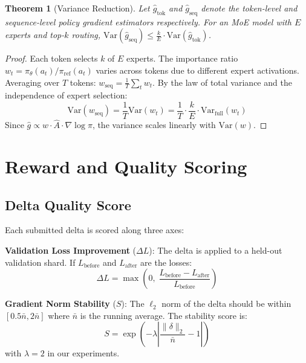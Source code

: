 \documentclass[11pt,letterpaper]{article}
\newtheorem{theorem}{Theorem}[section]
\begin{document}
\begin{theorem}[Variance Reduction]
Let $\hat{g}_{\text{tok}}$ and $\hat{g}_{\text{seq}}$ denote the token-level and sequence-level policy gradient estimators respectively.  For an MoE model with $E$ experts and top-$k$ routing, $\text{Var}(\hat{g}_{\text{seq}}) \leq \frac{k}{E} \cdot \text{Var}(\hat{g}_{\text{tok}})$.
\end{theorem}

\begin{proof}
Each token selects $k$ of $E$ experts.  The importance ratio $w_t = \pi_\theta(a_t) / \pi_{\text{ref}}(a_t)$ varies across tokens due to different expert activations.  Averaging over $T$ tokens: $w_{\text{seq}} = \frac{1}{T}\sum_t w_t$.  By the law of total variance and the independence of expert selection:
\[
    \text{Var}(w_{\text{seq}}) = \frac{1}{T}\text{Var}(w_t) = \frac{1}{T}\cdot\frac{k}{E}\cdot\text{Var}_{\text{full}}(w_t)
\]
Since $\hat{g} \propto w \cdot \hat{A} \cdot \nabla \log \pi$, the variance scales linearly with $\text{Var}(w)$.
\end{proof}

\section{Reward and Quality Scoring}
\label{sec:rewards}

\subsection{Delta Quality Score}

Each submitted delta is scored along three axes:

\textbf{Validation Loss Improvement} ($\Delta L$): The delta is applied to a held-out validation shard.  If $L_{\text{before}}$ and $L_{\text{after}}$ are the losses:
\begin{equation}
    \Delta L = \max\!\left(0, \; \frac{L_{\text{before}} - L_{\text{after}}}{L_{\text{before}}}\right)
\end{equation}

\textbf{Gradient Norm Stability} ($S$): The $\ell_2$ norm of the delta should be within $[0.5\bar{n}, 2\bar{n}]$ where $\bar{n}$ is the running average.  The stability score is:
\begin{equation}
    S = \exp\!\left(-\lambda \left|\frac{\|\delta\|_2}{\bar{n}} - 1\right|\right)
\end{equation}
with $\lambda = 2$ in our experiments.
\end{document}
